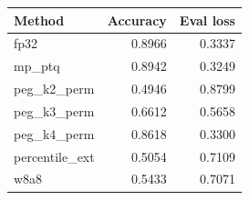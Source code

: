 \begin{tabular}{lrr}
\toprule
Method & Accuracy & Eval loss\\
\midrule
fp32 & 0.8966 & 0.3337\\
mp_ptq & 0.8942 & 0.3249\\
peg_k2_perm & 0.4946 & 0.8799\\
peg_k3_perm & 0.6612 & 0.5658\\
peg_k4_perm & 0.8618 & 0.3300\\
percentile_ext & 0.5054 & 0.7109\\
w8a8 & 0.5433 & 0.7071\\
\bottomrule
\end{tabular}
